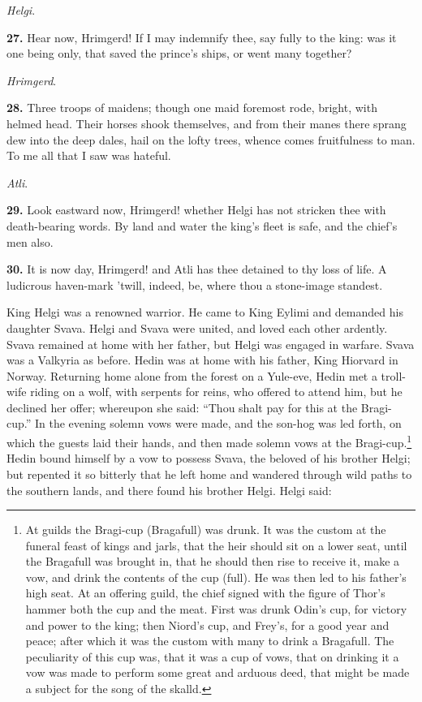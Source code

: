 \emph{Helgi}.

\textbf{27.} Hear now, Hrimgerd! If I may indemnify thee, say fully to the
king: was it one being only, that saved the prince's ships, or went
many together?

\emph{Hrimgerd}.

\textbf{28.} Three troops of maidens; though one maid foremost rode, bright,
with helmed head. Their horses shook themselves, and from their manes
there sprang dew into the deep dales, hail on the lofty trees, whence
comes fruitfulness to man. To me all that I saw was hateful.

\emph{Atli}.

\textbf{29.} Look eastward now, Hrimgerd! whether Helgi has not stricken thee
with death-bearing words. By land and water the king's fleet is safe,
and the chief's men also.

\textbf{30.} It is now day, Hrimgerd! and Atli has thee detained to thy loss
of life. A ludicrous haven-mark 'twill, indeed, be, where thou a
stone-image standest.

King Helgi was a renowned warrior. He came to King Eylimi and demanded
his daughter Svava. Helgi and Svava were united, and loved each other
ardently. Svava remained at home with her father, but Helgi was
engaged in warfare. Svava was a Valkyria as before. Hedin was at home
with his father, King Hiorvard in Norway. Returning home alone from
the forest on a Yule-eve, Hedin met a troll-wife riding on a wolf,
with serpents for reins, who offered to attend him, but he declined
her offer; whereupon she said: ``Thou shalt pay for this at the
Bragi-cup.'' In the evening solemn vows were made, and the son-hog was
led forth, on which the guests laid their hands, and then made solemn
vows at the Bragi-cup.\footnote{At guilds the Bragi-cup (Bragafull) was drunk. It was
the custom at the funeral feast of kings and jarls, that the heir
should sit on a lower seat, until the Bragafull was brought in, that
he should then rise to receive it, make a vow, and drink the contents
of the cup (full). He was then led to his father's high seat. At an
offering guild, the chief signed with the figure of Thor's hammer both
the cup and the meat. First was drunk Odin's cup, for victory and
power to the king; then Niord's cup, and Frey's, for a good year and
peace; after which it was the custom with many to drink a Bragafull.
The peculiarity of this cup was, that it was a cup of vows, that on
drinking it a vow was made to perform some great and arduous deed,
that might be made a subject for the song of the skalld.} Hedin bound himself by a vow to possess
Svava, the beloved of his brother Helgi; but repented it so bitterly
that he left home and wandered through wild paths to the southern
lands, and there found his brother Helgi. Helgi said:

